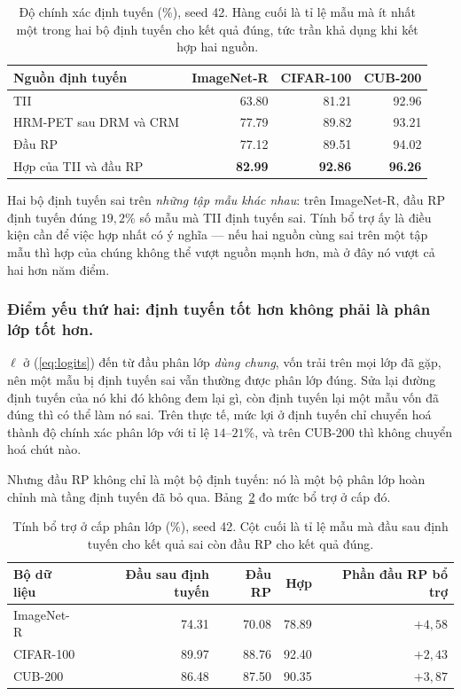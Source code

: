 \documentclass[runningheads]{llncs}
\begin{document}
\begin{table}
\caption{Độ chính xác định tuyến (\%), seed 42. Hàng cuối là tỉ lệ mẫu mà ít
nhất một trong hai bộ định tuyến cho kết quả đúng, tức trần khả dụng khi kết hợp
hai nguồn.}\label{tab:routing}
\begin{tabular}{lrrr}
\hline
Nguồn định tuyến & ImageNet-R & CIFAR-100 & CUB-200\\
\hline
TII                    & 63.80 & 81.21 & 92.96\\
HRM-PET sau DRM và CRM & 77.79 & 89.82 & 93.21\\
Đầu RP                 & 77.12 & 89.51 & 94.02\\
\hline
Hợp của TII và đầu RP  & \textbf{82.99} & \textbf{92.86} & \textbf{96.26}\\
\hline
\end{tabular}
\end{table}

Hai bộ định tuyến sai trên \emph{những tập mẫu khác nhau}: trên ImageNet-R, đầu
RP định tuyến đúng $19{,}2\%$ số mẫu mà TII định tuyến sai. Tính bổ trợ ấy là
điều kiện cần để việc hợp nhất có ý nghĩa --- nếu hai nguồn cùng sai trên một tập
mẫu thì hợp của chúng không thể vượt nguồn mạnh hơn, mà ở đây nó vượt cả hai hơn
năm điểm.

\subsubsection{Điểm yếu thứ hai: định tuyến tốt hơn không phải là phân lớp tốt hơn.}
$\ell$ ở (\ref{eq:logits}) đến từ đầu phân lớp \emph{dùng chung}, vốn trải trên
mọi lớp đã gặp, nên một mẫu bị định tuyến sai vẫn thường được phân lớp đúng. Sửa
lại đường định tuyến của nó khi đó không đem lại gì, còn định tuyến lại một mẫu
vốn đã đúng thì có thể làm nó sai. Trên thực tế, mức lợi ở định tuyến chỉ chuyển
hoá thành độ chính xác phân lớp với tỉ lệ $14$--$21\%$, và trên CUB-200 thì
không chuyển hoá chút nào.

Nhưng đầu RP không chỉ là một bộ định tuyến: nó là một bộ phân lớp hoàn chỉnh mà
tầng định tuyến đã bỏ qua. Bảng~\ref{tab:cls} đo mức bổ trợ ở cấp đó.

\begin{table}
\caption{Tính bổ trợ ở cấp phân lớp (\%), seed 42. Cột cuối là tỉ lệ mẫu mà đầu
sau định tuyến cho kết quả sai còn đầu RP cho kết quả đúng.}\label{tab:cls}
\begin{tabular}{lrrrr}
\hline
Bộ dữ liệu & Đầu sau định tuyến & Đầu RP & Hợp & Phần đầu RP bổ trợ\\
\hline
ImageNet-R & 74.31 & 70.08 & 78.89 & $+4{,}58$\\
CIFAR-100  & 89.97 & 88.76 & 92.40 & $+2{,}43$\\
CUB-200    & 86.48 & 87.50 & 90.35 & $+3{,}87$\\
\hline
\end{tabular}
\end{table}
\end{document}
